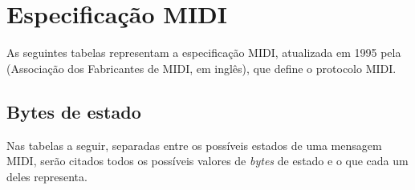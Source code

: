 \chapter{Especificação MIDI}

    As seguintes tabelas representam a especificação MIDI, atualizada em 1995 pela  (Associação dos Fabricantes de MIDI, em inglês), que define o protocolo MIDI.

    \section{Bytes de estado}

        Nas tabelas a seguir, separadas entre os possíveis estados de uma mensagem MIDI, serão citados todos os possíveis valores de \textit{bytes} de estado e o que cada um deles representa.


